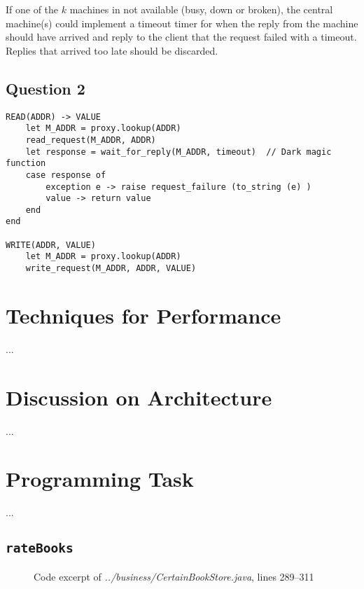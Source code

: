 \documentclass[10pt,a4paper]{article}
\newcommand{\srcroot}{../src/com/acertainbookstore/}
\newcommand{\codeexcerpt}[3]
{
\begin{figure}[H]

\caption{Code excerpt of {\it ../#1}, lines #2--#3}
\end{figure}
}
\begin{document}
If one of the $k$ machines in not available (busy, down or broken), the central machine(s) could implement a timeout timer for when the reply from the machine should have arrived and reply to the client that the request failed with a timeout. Replies that arrived too late should be discarded.

\subsection{Question 2}

\begin{lstlisting}
READ(ADDR) -> VALUE
    let M_ADDR = proxy.lookup(ADDR)
    read_request(M_ADDR, ADDR)
    let response = wait_for_reply(M_ADDR, timeout)  // Dark magic function
    case response of
        exception e -> raise request_failure (to_string (e) )
        value -> return value
    end
end

WRITE(ADDR, VALUE)
    let M_ADDR = proxy.lookup(ADDR)
    write_request(M_ADDR, ADDR, VALUE)

\end{lstlisting}


\section{Techniques for Performance}
...



\section{Discussion on Architecture}
...



\section{Programming Task}
...

\subsection{\tt rateBooks}
\codeexcerpt{business/CertainBookStore.java}{289}{311}
\end{document}
